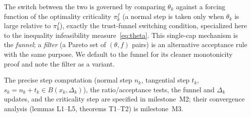 The switch between the two is governed by comparing $\theta_k$ against a forcing
function of the optimality criticality $\pi_k^f$ (a normal step is taken only when
$\theta_k$ is large relative to $\pi_k^f$), exactly the trust-funnel switching
condition, specialized here to the inequality infeasibility
measure~\eqref{eq:theta}. This single-cap mechanism is the \emph{funnel}; a
\emph{filter} (a Pareto set of $(\theta,f)$ pairs) is an alternative acceptance
rule with the same purpose. We default to the funnel for its cleaner monotonicity
proof and note the filter as a variant.

The precise step computation (normal step $n_k$, tangential step $t_k$,
$s_k=n_k+t_k\in B(x_k,\Delta_k)$), the ratio/acceptance tests, the funnel and
$\Delta_k$ updates, and the criticality step are specified in milestone~M2; their
convergence analysis (lemmas L1--L5, theorems T1--T2) is milestone~M3.
